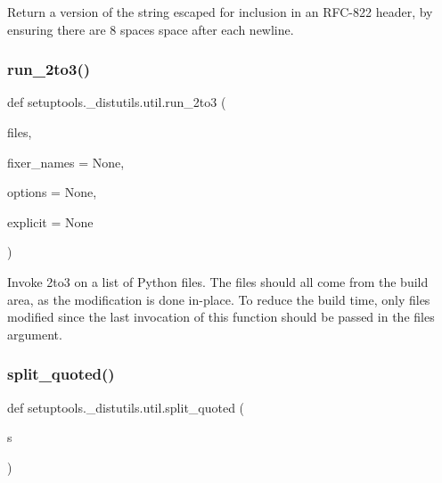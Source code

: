 \begin{DoxyVerb}Return a version of the string escaped for inclusion in an
RFC-822 header, by ensuring there are 8 spaces space after each newline.
\end{DoxyVerb}
 \mbox{\label{namespacesetuptools_1_1__distutils_1_1util_a9ca6b35db5ee9af95c1dac142eaa2d02}} 
\subsubsection{\texorpdfstring{run\+\_\+2to3()}{run\_2to3()}}
{\footnotesize\ttfamily def setuptools.\+\_\+distutils.\+util.\+run\+\_\+2to3 (\begin{DoxyParamCaption}\item[{}]{files,  }\item[{}]{fixer\+\_\+names = {\ttfamily None},  }\item[{}]{options = {\ttfamily None},  }\item[{}]{explicit = {\ttfamily None} }\end{DoxyParamCaption})}

\begin{DoxyVerb}Invoke 2to3 on a list of Python files.
The files should all come from the build area, as the
modification is done in-place. To reduce the build time,
only files modified since the last invocation of this
function should be passed in the files argument.\end{DoxyVerb}
 \mbox{\label{namespacesetuptools_1_1__distutils_1_1util_a85372e3f1902fea198901c304990ac42}} 
\subsubsection{\texorpdfstring{split\+\_\+quoted()}{split\_quoted()}}
{\footnotesize\ttfamily def setuptools.\+\_\+distutils.\+util.\+split\+\_\+quoted (\begin{DoxyParamCaption}\item[{}]{s }\end{DoxyParamCaption})}

